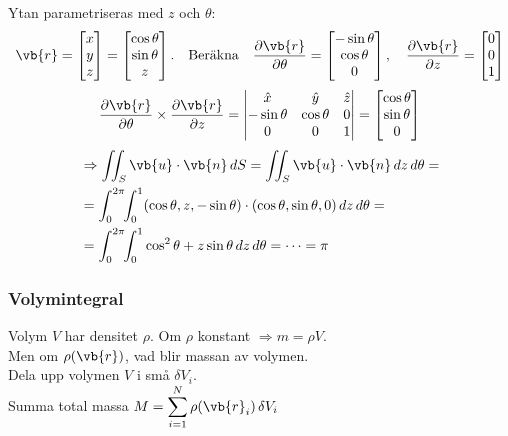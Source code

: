 \begin{example}
Ytan parametriseras med $z$ och $\theta$:
\[ \vb{r} = \begin{bmatrix} x \\ y \\ z \end{bmatrix} = \begin{bmatrix} \cos\theta \\ \sin\theta \\ z \end{bmatrix}. \quad \text{Beräkna} \quad \frac{\partial\vb{r}}{\partial\theta} = \begin{bmatrix} -\sin\theta \\ \cos\theta \\ 0 \end{bmatrix}, \quad \frac{\partial\vb{r}}{\partial z} = \begin{bmatrix} 0 \\ 0 \\ 1 \end{bmatrix} \]
\[ \frac{\partial\vb{r}}{\partial\theta} \times \frac{\partial\vb{r}}{\partial z} = \begin{vmatrix} \hat{x} & \hat{y} & \hat{z} \\ -\sin\theta & \cos\theta & 0 \\ 0 & 0 & 1 \end{vmatrix} = \begin{bmatrix} \cos\theta \\ \sin\theta \\ 0 \end{bmatrix} \]
\begin{align*}
&\Rightarrow \iint_S \vb{u} \cdot \vb{n}\,dS = \iint_S \vb{u} \cdot \vb{n}\,dz\,d\theta = \\
&= \int_0^{2\pi}\!\!\int_0^1 (\cos\theta, z, -\sin\theta) \cdot (\cos\theta, \sin\theta, 0)\,dz\,d\theta = \\
&= \int_0^{2\pi}\!\!\int_0^1 \cos^2\theta + z\sin\theta\,dz\,d\theta = \dots = \pi
\end{align*}
\end{example}

\subsubsection*{Volymintegral}
Volym $V$ har densitet $\rho$. Om $\rho$ konstant $\Rightarrow m = \rho V$.\\
Men om $\rho(\vb{r})$, vad blir massan av volymen.\\
Dela upp volymen $V$ i små $\delta V_i$.\\
Summa total massa $M = \displaystyle\sum_{i=1}^N \rho(\vb{r}_i)\,\delta V_i$
